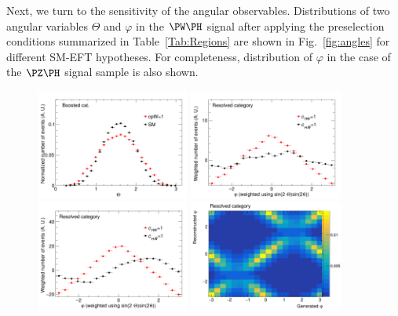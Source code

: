 \documentclass[a4paper,11pt]{article}
\begin{document}
Next, we turn to the sensitivity of the angular observables. 
Distributions of two angular variables $\Theta$ and $\varphi$ in the $\PW\PH$ signal after applying the preselection conditions summarized in Table~\ref{Tab:Regions} are shown in Fig.~\ref{fig:angles} for different SM-EFT hypotheses. 
For completeness, distribution of $\varphi$ in the case of the $\PZ\PH$ signal sample is also shown.
\begin{figure}[hbtp]
\begin{center}
\includegraphics[width=0.45\textwidth]{Figures/New/RECO/Boosted_Plot_Theta_WH.png}
\includegraphics[width=0.45\textwidth]{Figures/New/RECO/Resolved_Plot_phi_WH_CP.png}
\includegraphics[width=0.45\textwidth]{Figures/New/RECO/Resolved_Plot_phi_ZH_CP.png}
\includegraphics[width=0.45\textwidth]{Figures/New/RECO/Resolved_Plot_2D_phi_unweighted.png}

\end{center}
\end{figure}
\end{document}
